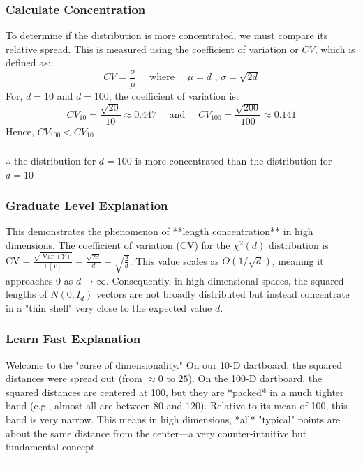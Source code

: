 \documentclass{article}
\begin{document}
\subsubsection*{Calculate Concentration}
To determine if the distribution is more concentrated, we must compare its relative spread. This is measured using the coefficient of variation or $CV$, which is defined as:
$$CV = \frac{\sigma}{\mu} \quad \text{ where } \quad \mu=d \text{ ,  } \sigma = \sqrt{2d}$$
For, $d=10$ and $d=100$, the coefficient of variation is:
$$CV_{10} = \frac{\sqrt{20}}{10} \approx 0.447\quad \text{ and }\quad CV_{100} = \frac{\sqrt{200}}{100} \approx 0.141$$
Hence, $CV_{100} < CV_{10}$ 

\subsubsection*{\normalfont}{$\therefore$ the distribution for $d=100$ is more concentrated than the distribution for $d=10$}

\subsubsection*{Graduate Level Explanation}
This demonstrates the phenomenon of **length concentration** in high dimensions. The coefficient of variation (CV) for the $\chi^2(d)$ distribution is $\text{CV} = \frac{\sqrt{\operatorname{Var}(Y)}}{\mathbb{E}[Y]} = \frac{\sqrt{2d}}{d} = \sqrt{\frac{2}{d}}$. This value scales as $O(1/\sqrt{d})$, meaning it approaches 0 as $d \to \infty$. Consequently, in high-dimensional spaces, the squared lengths of $N(0, I_d)$ vectors are not broadly distributed but instead concentrate in a "thin shell" very close to the expected value $d$.

\subsubsection*{Learn Fast Explanation}
Welcome to the "curse of dimensionality." On our 10-D dartboard, the squared distances were spread out (from $\approx 0$ to $25$). On the 100-D dartboard, the squared distances are centered at 100, but they are *packed* in a much tighter band (e.g., almost all are between 80 and 120). Relative to its mean of 100, this band is very narrow. This means in high dimensions, *all* "typical" points are about the same distance from the center—a very counter-intuitive but fundamental concept.

\noindent\rule{\textwidth}{0.4pt}\\
\end{document}

